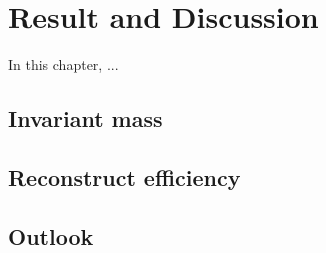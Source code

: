 \chapter{Result and Discussion} \label{Discussion}

In this chapter, ...

\section{Invariant mass}\label{sec:inv mass}


\section{Reconstruct efficiency}\label{sec:reco eff}

\section{Outlook}\label{sec:outlook}


